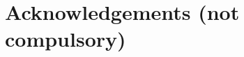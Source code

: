\documentclass[fleqn,10pt]{wlscirep}
\begin{document}






 


%


\section*{Acknowledgements (not compulsory)}
\end{document}
